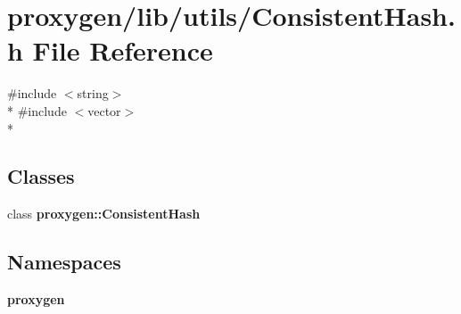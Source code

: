 \section{proxygen/lib/utils/\+Consistent\+Hash.h File Reference}
\label{ConsistentHash_8h}
{\ttfamily \#include $<$string$>$}\\*
{\ttfamily \#include $<$vector$>$}\\*
\subsection*{Classes}
\begin{DoxyCompactItemize}
\item 
class {\bf proxygen\+::\+Consistent\+Hash}
\end{DoxyCompactItemize}
\subsection*{Namespaces}
\begin{DoxyCompactItemize}
\item 
 {\bf proxygen}
\end{DoxyCompactItemize}
